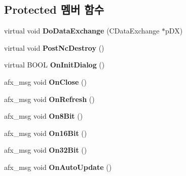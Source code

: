 \subsection*{Protected 멤버 함수}
\begin{DoxyCompactItemize}
\item 
\mbox{\label{class_g_b_memory_viewer_dlg_a124868a573da84a7958c38409059bde3}} 
virtual void {\bfseries Do\+Data\+Exchange} (C\+Data\+Exchange $\ast$p\+DX)
\item 
\mbox{\label{class_g_b_memory_viewer_dlg_a5c0847f6b059bc27ccf18ae85ebe249a}} 
virtual void {\bfseries Post\+Nc\+Destroy} ()
\item 
\mbox{\label{class_g_b_memory_viewer_dlg_a17f1561370d3e56e71044555399dc8de}} 
virtual B\+O\+OL {\bfseries On\+Init\+Dialog} ()
\item 
\mbox{\label{class_g_b_memory_viewer_dlg_aff8b13af0ecd94d5ef812dbfcb73728a}} 
afx\+\_\+msg void {\bfseries On\+Close} ()
\item 
\mbox{\label{class_g_b_memory_viewer_dlg_a06c19ee769949ce93010ff891bcac340}} 
afx\+\_\+msg void {\bfseries On\+Refresh} ()
\item 
\mbox{\label{class_g_b_memory_viewer_dlg_a3e6f7abe8cf8dbc567d662eb33cf569b}} 
afx\+\_\+msg void {\bfseries On8\+Bit} ()
\item 
\mbox{\label{class_g_b_memory_viewer_dlg_a52b3f9fedab4314bd634becf88c756a2}} 
afx\+\_\+msg void {\bfseries On16\+Bit} ()
\item 
\mbox{\label{class_g_b_memory_viewer_dlg_a4e97f32250cfe77d1381fb21eed6daa4}} 
afx\+\_\+msg void {\bfseries On32\+Bit} ()
\item 
\mbox{\label{class_g_b_memory_viewer_dlg_a7c7da28ae22f8a9f5f8ad3e6bb358949}} 
afx\+\_\+msg void {\bfseries On\+Auto\+Update} ()
\item 
\mbox{\label{class_g_b_memory_viewer_dlg_ade5919e22370d16bb0457a79f81d5877}} 

\end{DoxyCompactItemize}

